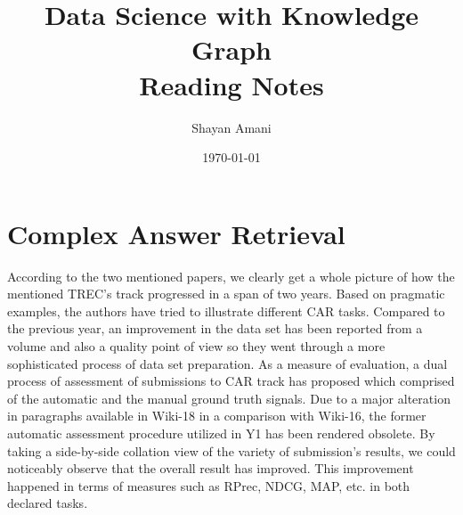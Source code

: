\documentclass[a4paper,12pt]{article}
\title{Data Science with Knowledge Graph \\{\large Reading Notes}}
\author{Shayan Amani}
\date{\today}
\begin{document}
\maketitle

\section{Complex Answer Retrieval}
According to the two mentioned papers, we clearly get a whole picture of how the mentioned TREC's track progressed in a span of two years. Based on pragmatic examples, the authors have tried to illustrate different CAR tasks. Compared to the previous year, an improvement in the data set has been reported from a volume and also a quality point of view so they went through a more sophisticated process of data set preparation. As a measure of evaluation, a dual process of assessment of submissions to CAR track has proposed which comprised of the automatic and the manual ground truth signals. Due to a major alteration in paragraphs available in Wiki-18 in a comparison with Wiki-16, the former automatic assessment procedure utilized in Y1 has been rendered obsolete. By taking a side-by-side collation view of the variety of submission's results, we could noticeably observe that the overall result has improved. This improvement happened in terms of measures such as RPrec, NDCG, MAP, etc. in both declared tasks.
\end{document}
